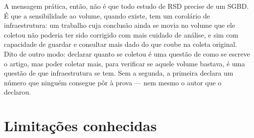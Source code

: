 A mensagem prática, então, não é que todo estudo de RSD precise de um SGBD. É que a
sensibilidade ao volume, quando existe, tem um corolário de infraestrutura: um trabalho
cuja conclusão ainda se movia no volume que ele coletou não poderia ter sido corrigido
com mais cuidado de análise, e sim com capacidade de guardar e consultar mais dado do
que coube na coleta original. Dito de outro modo: declarar quanto se coletou é uma questão de como se
escreve o artigo, mas poder coletar mais, para verificar se aquele volume bastava, é
uma questão de que infraestrutura se tem. Sem a segunda, a primeira declara um número
que ninguém consegue pôr à prova --- nem mesmo o autor que o declarou.

\section{Limitações conhecidas}
\label{sec:limitacoes}

